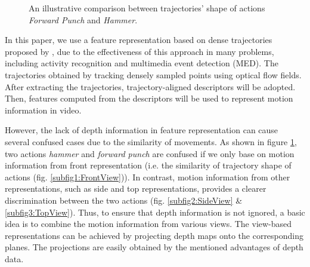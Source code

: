 \documentclass[review]{elsarticle}
\begin{document}
\begin{figure}
{		}
		\hfill		
	\caption{An illustrative comparison between trajectories' shape of actions \textit{Forward Punch} and \textit{Hammer}.}
	\label{fig:Illustration}
\end{figure}

In this paper, we use a feature representation based on dense trajectories proposed by \cite{wang2011densetraj}, due to the effectiveness of this approach in many problems, including  activity recognition and multimedia event detection (MED). The trajectories obtained by tracking densely sampled points using optical flow fields. After extracting the trajectories, trajectory-aligned descriptors will be adopted. Then, features computed from the descriptors will be used to represent motion information in video.

However, the lack of depth information in feature representation can cause several confused cases due to the similarity of movements. As shown in figure \ref{fig:Illustration}, two actions \textit{hammer} and \textit{forward punch} are confused if we only base on motion information from front representation (i.e. the similarity of trajectory shape of actions (fig. \ref{subfig1:FrontView})). In contrast, motion information from other representations, such as side and top representations, provides a clearer discrimination between the two actions (fig. \ref{subfig2:SideView} \& \ref{subfig3:TopView}). Thus, to ensure that depth information is not ignored, a basic idea is to combine the motion information from various views. The view-based representations can be achieved by projecting depth maps onto the corresponding planes. The projections are easily obtained by the mentioned advantages of depth data.
\end{document}
